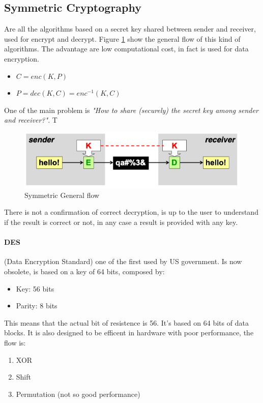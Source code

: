 \documentclass[12pt]{article}
\begin{document}
\subsection{Symmetric Cryptography}
Are all the algorithms based on a secret key shared between sender and receiver, used for encrypt and decrypt. Figure \ref{fig:symm} show the general flow of this kind of algorithms. The advantage are low computational cost, in fact is used for data encryption.\\
\begin{itemize}
  \item $C = enc(K, P)$
  \item $P = dec(K, C) = enc^{-1}(K, C)$
\end{itemize}
One of the main problem is \textit{"How to share (securely) the secret key among sender and receiver?"}. T
\begin{figure}[H]
  \includegraphics[width=\linewidth]{images/symm.png}
  \caption{Symmetric General flow}
  \label{fig:symm}
\end{figure}
There is not a confirmation of correct decryption, is up to the user to understand if the result is correct or not, in any case a result is provided with any key.\\

\paragraph{DES} (Data Encryption Standard) one of the first used by US government. Is now obsolete, is based on a key of 64 bits, composed by:
\begin{itemize}
  \item Key: 56 bits
  \item Parity: 8 bits
\end{itemize}
This means that the actual bit of resistence is 56. It's based on 64 bits of data blocks. It is also designed to be efficent in hardware with poor performance, the flow is:
\begin{enumerate}
  \item XOR
  \item Shift
  \item Permutation (not so good performance)
\end{enumerate}
\end{document}
